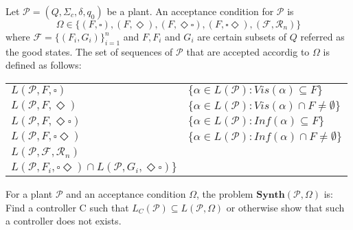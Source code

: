 \documentclass[table]{beamer}
\newcommand{\Plant}{\ensuremath{\mathcal{P}=(Q,\Sigma_c,\delta, q_0)}}
\newcommand{\AccpCond}{\ensuremath{\{(F,\square),(F,\Diamond ),(F,\Diamond\square),(F,\square\Diamond),(\mathcal{F},\mathcal{R}_n)\}}}
\newcommand{\Synth}{\ensuremath{\textbf{Synth}(\mathcal{P},\Omega)}}
\begin{document}
\begin{frame}
	\begin{dfn}
		Let $\Plant$ be a plant. An acceptance condition for $\mathcal{P}$ is
		$$ \Omega \in \AccpCond$$
		where $\mathcal{F} = \{(F_i,G_i)\}^{n}_{i=1}$ and $F, F_i$ and $G_i$ 
		are certain subsets of $Q$ referred as the good states. The set of sequences of $\mathcal{P}$ that are accepted
		accordig to $\Omega$ is defined as follows:
	\end{dfn}
	\begin{adjustwidth}{-1cm}{-1cm}
	\begin{table}[]
		\begin{tabular}{ll}
		\hline
		\rowcolor{azzurro_chiaro}
		$L(\mathcal{P},F,\square)$ & $\{\alpha \in L(\mathcal{P}):Vis(\alpha)\subseteq F\}$ \\ 
		$L(\mathcal{P},F,\Diamond)$ & $\{\alpha \in L(\mathcal{P}):Vis(\alpha)\cap F \neq \emptyset\}$ \\ 
		\rowcolor{azzurro_chiaro}
		$L(\mathcal{P},F,\Diamond\square)$ & $\{\alpha \in L(\mathcal{P}):Inf(\alpha)\subseteq F\}$ \\ 
		$L(\mathcal{P},F,\square\Diamond)$ & $\{\alpha \in L(\mathcal{P}):Inf(\alpha)\cap F \neq \emptyset\}$\\ 
		\rowcolor{azzurro_chiaro}
		$L(\mathcal{P},\mathcal{F},\mathcal{R}_n)$ & \shortstack{
			$\{\alpha \in L(\mathcal{P}): \exists i \alpha \in$ \\
			$L(\mathcal{P},F_i,\square\Diamond) \cap L(\mathcal{P},G_i,\Diamond\square)\}$
		} \\ 
		\hline
		\end{tabular}
	\end{table}
	\end{adjustwidth}
\end{frame}

\begin{frame}
	\begin{dfn}
		For a plant $\mathcal{P}$ and an acceptance condition $\Omega$, the problem $\Synth$ is:
		Find a controller C such that $L_C(\mathcal{P})\subseteq L(\mathcal{P},\Omega)$ or otherwise show that such a controller does not exists.
	\end{dfn}
\end{frame}
\end{document}
